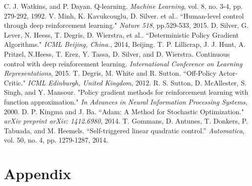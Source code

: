 \documentclass[english, dvipdfmx]{ampmt}             %
\begin{document}
\begin{thebibliography}{10}
C. J. Watkins, and P. Dayan. Q-learning. \textit{Machine Learning}, vol. 8, no. 3-4, pp. 279-292, 1992.
V. Minh, K. Kavukcouglu, D. Silver. et al.. “Human-level control through deep reinforcement learning." \textit{Nature 518}, pp.529-533, 2015.
D. Silver, G. Lever, N. Heess, T. Degris, D. Wierstra, et al.. “Deterministic Policy Gradient Algorithms." \textit{ICML Beijing, China.}, 2014, Beijing.
T. P. Lillicrap, J. J. Hunt, A. Pritzel, N.Heess, T. Erez, Y. Tassa, D. Silver, and D. Wierstra. Continuous control with deep reinforcement learning. \textit{International Conference on Learning Representations}, 2015.
T. Degris, M. White and R. Sutton. “Off-Policy Actor-Critic." \textit{ICML Edinburgh, United Kingdom}, 2012.
R. S. Sutton, D. McAllester, S. Singh, and Y. Mansour. "Policy gradient methods for reinforcement learning with function approximation." \textit{In Advances in Neural Information Processing Systems}, 2000.
D. P. Kingma and J. Ba. “Adam: A Method for Stochastic Optimization." \textit{arXiv preprint arXiv: 1412.6980}, 2014.
T. Gommans, D. Antunes, T. Donkers, P. Tabuada, and M. Heemels. “Self-triggered linear quadratic control.” \textit{Automatica}, vol. 50, no. 4, pp. 1279-1287, 2014.

\end{thebibliography}

\appendix

\section{Appendix}
\end{document}

